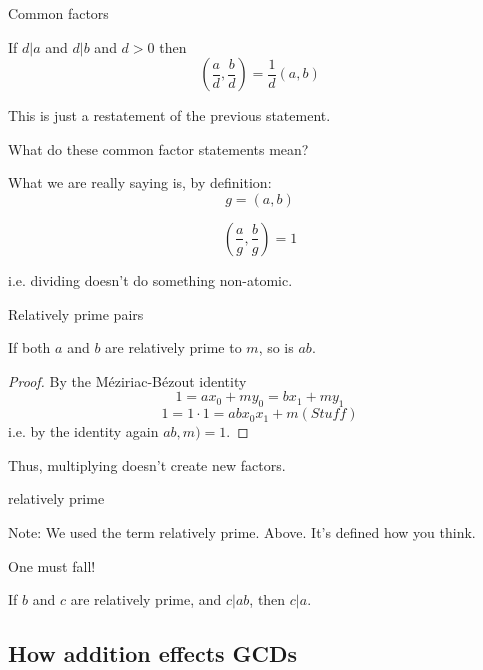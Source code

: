 \documentclass{beamer}
\begin{document}
\begin{frame}{Common factors}

  \begin{theorem}
    If $d | a$ and $d | b$ and $d > 0$ then 
    $$(\frac{a}{d}, \frac{b}{d}) = \frac{1}{d}(a, b)$$
  \end{theorem}

This is just a restatement of the previous statement.

\end{frame}

\begin{frame}{What do these common factor statements mean?}

  What we are really saying is, by definition:
  $$g = (a, b)$$
  
  $$( \frac{a}{g}, \frac{b}{g} ) = 1$$

  i.e. dividing doesn't do something non-atomic.

\end{frame}

\begin{frame}{Relatively prime pairs}

  If both $a$ and $b$ are relatively prime to $m$, so is $ab$.
  
  \begin{proof}
    By the M\'eziriac-B\'ezout identity 
    $$1 = ax_0 + my_0 = bx_1 + my_1$$
    $$1 = 1 \cdot 1 = abx_0x_1 + m( Stuff)$$
    i.e. by the identity again $ab, m) = 1$.
  \end{proof}
  
  Thus, multiplying doesn't create new factors.

\end{frame}

\begin{frame}{relatively prime}

  Note: We used the term relatively prime. Above. It's defined how you
  think.

\end{frame}

\begin{frame}{One must fall!}

  If $b$ and $c$ are relatively prime, and $c | ab$, then $c|a$.

\end{frame}

\subsection{How addition effects GCDs}
\end{document}
